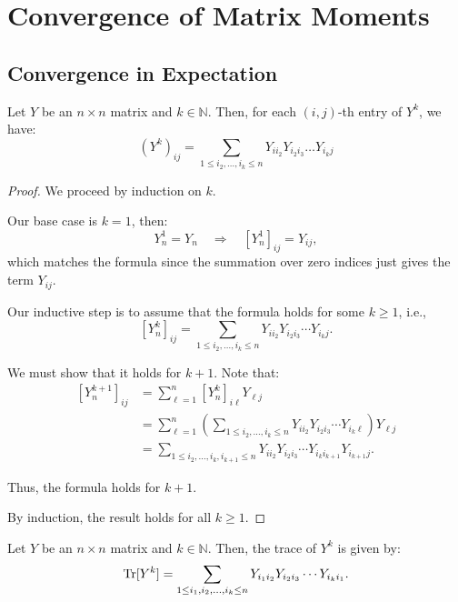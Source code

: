 \chapter{Convergence of Matrix Moments}
\section{Convergence in Expectation}

\begin{lemma}
    \label{lem:matrix_powers_entries}
    \notready
    Let $Y$ be an $n\times n$ matrix and $k \in \mathbb{N}$. Then, for each  $(i, j)$-th entry of $Y^{k}$, we have:
    $$
    (Y^{k})_{ij} = \sum_{1 \leq i_2, \ldots ,i_{k} \leq n} Y_{ii_{2}} Y_{i_{2}i_{3}}\ldots Y_{i_{k}j}
    $$
\end{lemma}

\begin{proof}
\notready
We proceed by induction on $k$.

Our base case is $k=1$, then:
$$
Y_n^1 = Y_n \quad \Rightarrow \quad [Y_n^1]_{ij} = Y_{ij},
$$
which matches the formula since the summation over zero indices just gives the term $Y_{ij}$.

Our inductive step is to assume that the formula holds for some $k \ge 1$, i.e.,
$$
\left[Y_n^k\right]_{ij} = \sum_{1 \le i_2, \dots, i_k \le n} Y_{i i_2} Y_{i_2 i_3} \cdots Y_{i_k j}.
$$

We must show that it holds for $k + 1$. Note that:
\begin{align*}
\left[Y_n^{k+1}\right]_{ij}
&= \sum_{\ell = 1}^n \left[Y_n^k\right]_{i\ell} Y_{\ell j} \\
&= \sum_{\ell = 1}^n \left( \sum_{1 \le i_2, \dots, i_k \le n} Y_{i i_2} Y_{i_2 i_3} \cdots Y_{i_k \ell} \right) Y_{\ell j} \\
&= \sum_{1 \le i_2, \dots, i_k, i_{k+1} \le n} Y_{i i_2} Y_{i_2 i_3} \cdots Y_{i_k i_{k+1}} Y_{i_{k+1} j}.
\end{align*}

Thus, the formula holds for $k + 1$.

By induction, the result holds for all $k \ge 1$.
\end{proof}

\begin{lemma}
    \label{lem:matrix_powers_trace}
    \notready
    Let $Y$ be an $n\times n$ matrix and $k \in \mathbb{N}$. Then, the trace of $Y^{k}$ is given by:
    $$
    \operatorname{Tr}[Y^{k}] = \sum_{1 \leq i_1, i_2, \ldots, i_k \leq n} Y_{i_1 i_2} Y_{i_2 i_3} \cdots Y_{i_k i_1}.
    $$
\end{lemma}

